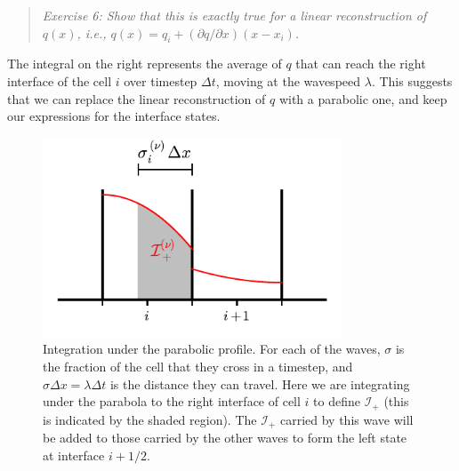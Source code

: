\documentclass[11pt]{article}
\begin{document}
\begin{quote}
{\em Exercise 6: Show that this is exactly true for a linear reconstruction of $q(x)$, i.e.,
$q(x) = q_i + (\partial q/\partial x) (x - x_i)$.}
\end{quote}

\noindent The integral on the right represents the average of $q$ that
can reach the right interface of the cell $i$ over timestep $\Delta
t$, moving at the wavespeed $\lambda$.  This suggests that we can
replace the linear reconstruction of $q$ with a parabolic one, and
keep our expressions for the interface states.

\begin{figure}
\centering
\includegraphics[width=3.5in]{ppm-trace}
\caption{\label{fig:ppm_trace} Integration under the parabolic
  profile.  For each of the waves, $\sigma$ is the fraction of the
  cell that they cross in a timestep, and $\sigma \Delta x = \lambda
  \Delta t$ is the distance they can travel.  Here we are integrating
  under the parabola to the right interface of cell $i$ to define
  $\mathcal{I}_+$ (this is indicated by the shaded region).  The $\mathcal{I}_+$ carried
  by this wave will be added to those carried by the other waves to
  form the left state at interface $i+1/2$.}
\end{figure}
\end{document}
